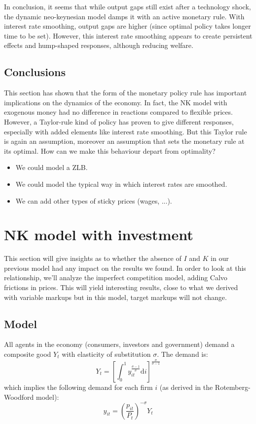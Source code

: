 \documentclass[12pt]{report}
\def\D{\mathrm{d}}
\def\D{\mathrm{d}}
\begin{document}
In conclusion, it seems that while output gaps still exist after a technology shock, the dynamic neo-keynesian model damps it with an active monetary rule. With interest rate smoothing, output gaps are higher (since optimal policy takes longer time to be set). However, this interest rate smoothing appears to create persistent effects and hump-shaped responses, although reducing welfare.

\subsection{Conclusions}

This section has shown that the form of the monetary policy rule has important implications on the dynamics of the economy. In fact, the NK model with exogenous money had no difference in reactions compared to flexible prices. However, a Taylor-rule kind of policy has proven to give different responses, especially with added elements like interest rate smoothing. But this Taylor rule is again an assumption, moreover an assumption that sets the monetary rule at its optimal. How can we make this behaviour depart from optimality?\begin{itemize}
\item We could model a ZLB.
\item We could model the typical way in which interest rates are smoothed.
\item We can add other types of sticky prices (wages, ...).
\end{itemize}

\section{NK model with investment}

This section will give insights as to whether the absence of $I$ and $K$ in our previous model had any impact on the results we found. In order to look at this relationship, we'll analyze the imperfect competition model, adding Calvo frictions in prices. This will yield interesting results, close to what we derived with variable markups but in this model, target markups will not change.

\subsection{Model}

All agents in the economy (consumers, investors and government) demand a composite good $Y_t$ with elasticity of substitution $\sigma$. The demand is: $$Y_t = \left[\int_0^1 y_{it}^\frac{\sigma - 1}{\sigma} \D i\right]^\frac{\sigma}{\sigma - 1} $$ which implies the following demand for each firm $i$ (as derived in the Rotemberg-Woodford model): $$y_{it} = \left(\frac{p_{it}}{P_t}\right)^{-\sigma} Y_t $$
\end{document}
